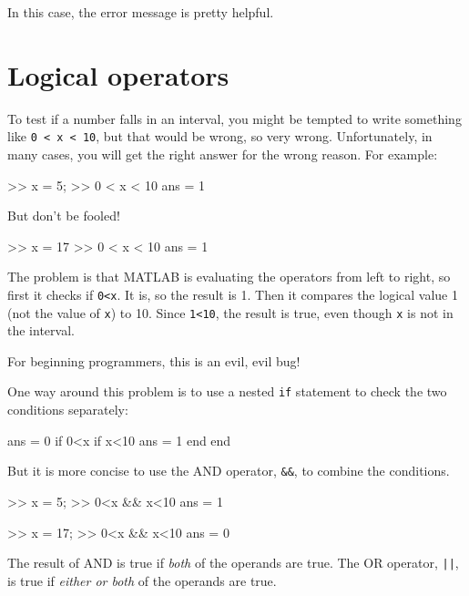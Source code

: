 \documentclass[
]{book}
\numberwithin{Answer}{chapter}
\numberwithin{Exercise}{chapter}
\begin{document}
In this case, the error message is pretty helpful.


\section{Logical operators}
\label{sect:logop}


To test if a number falls in an interval, you might be
tempted to write something like {\tt 0 < x < 10}, but that
would be wrong, so very wrong.  Unfortunately, in many cases,
you will get the right answer for the wrong reason.  For
example:

\begin{code}
>> x = 5;
>> 0 < x < 10            %
ans = 1
\end{code}

But don't be fooled!

\begin{code}
>> x = 17
>> 0 < x < 10            %
ans = 1
\end{code}

The problem is that MATLAB is evaluating the operators from left
to right, so first it checks if {\tt 0<x}.  It is, so the result
is 1.  Then it compares the logical value 1 (not the value of
{\tt x}) to 10.  Since {\tt 1<10}, the result is true, even though
{\tt x} is not in the interval.

For beginning programmers, this is an evil, evil bug!


One way around this problem is to use a nested {\tt if} statement to
check the two conditions separately:

\begin{code}
ans = 0
if 0<x
    if x<10
        ans = 1
    end
end
\end{code}

But it is more concise to use the AND operator, {\tt \&\&}, to
combine the conditions.

\begin{code}
>> x = 5;
>> 0<x && x<10
ans = 1

>> x = 17;
>> 0<x && x<10
ans = 0
\end{code}

The result of AND is true if {\em both} of the operands are
true.  The OR operator, {\tt ||}, is true if {\em either or both}
of the operands are true.
\end{document}
